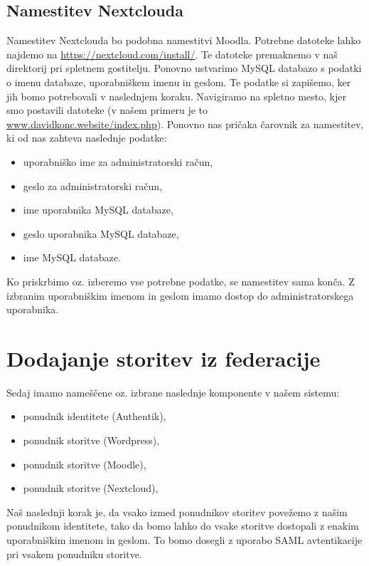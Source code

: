 \documentclass[a4paper,12pt,openright]{book}
\begin{document}
\section{Namestitev Nextclouda}

Namestitev Nextclouda bo podobna namestitvi Moodla. Potrebne datoteke lahko najdemo na \href{https://nextcloud.com/install/}{https://nextcloud.com/install/}. Te datoteke premaknemo v naš direktorij pri spletnem gostitelju. Ponovno ustvarimo MySQL databazo s podatki o imenu databaze, uporabniškem imenu in geslom. Te podatke si zapišemo, ker jih bomo potrebovali v naslednjem koraku.
\newline
Navigiramo na spletno mesto, kjer smo postavili datoteke (v našem primeru je to \href{www.davidkonc.website/index.php}{www.davidkonc.website/index.php}). Ponovno nas pričaka čarovnik za namestitev, ki od nas zahteva naslednje podatke:
\begin{itemize}
    \item uporabniško ime za administratorski račun,
    \item geslo za administratorski račun,
    \item ime uporabnika MySQL databaze,
    \item geslo uporabnika MySQL databaze,
    \item ime MySQL databaze.
\end{itemize}

Ko priskrbimo oz. izberemo vse potrebne podatke, se namestitev sama konča. Z izbranim uporabniškim imenom in geslom imamo dostop do administratorskega uporabnika.

\chapter{Dodajanje storitev iz federacije}

Sedaj imamo nameščene oz. izbrane naslednje komponente v našem sistemu:
\begin{itemize}
    \item ponudnik identitete (Authentik),
    \item ponudnik storitve (Wordpress),
    \item ponudnik storitve (Moodle),
    \item ponudnik storitve (Nextcloud),
\end{itemize}
Naš naslednji korak je, da vsako izmed ponudnikov storitev povežemo z našim ponudnikom identitete, tako da bomo lahko do vsake storitve dostopali z enakim uporabniškim imenom in geslom. To bomo dosegli z uporabo SAML avtentikacije pri vsakem ponudniku storitve. 
\end{document}
